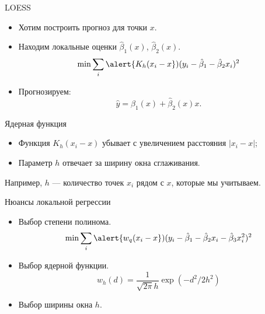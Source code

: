 \begin{frame}{LOESS}

\begin{itemize}
  \item Хотим построить прогноз для точки $x$.
  \item Находим \alert{локальные оценки} $\hat\beta_1(x)$, $\hat\beta_2(x)$. 
  \[
      \min \sum_i \alert{K_h(x_i - x}) (y_i - \hat\beta_1 - \hat\beta_2 x_i)^2
  \]
  \item Прогнозируем:
  \[
  \hat y = \hat\beta_1(x) + \hat\beta_2(x) x.  
  \] 
\end{itemize}

\pause
\alert{Ядерная функция}
\begin{itemize}
  \item Функция $K_h(x_i - x)$ убывает с увеличением расстояния $|x_i - x|$;
  \item Параметр $h$ отвечает за ширину окна сглаживания. 
\end{itemize}

\pause
Например, $h$ — количество точек $x_i$ рядом с $x$, которые мы учитываем.

\end{frame}

\begin{frame}{Нюансы локальной регрессии}

  \begin{itemize}
    \item Выбор \alert{степени полинома}.
    \[
      \min \sum_i \alert{w_q(x_i - x}) (y_i - \hat\beta_1 - \hat\beta_2 x_i - \hat\beta_3 x_i^2)^2
    \]  
    \item Выбор \alert{ядерной} функции.
    \[
      w_h(d) = \frac{1}{\sqrt{2\pi}h} \exp(- d^2/2h^2)
    \]
    \item Выбор \alert{ширины окна} $h$.

\end{itemize}

\end{frame}

